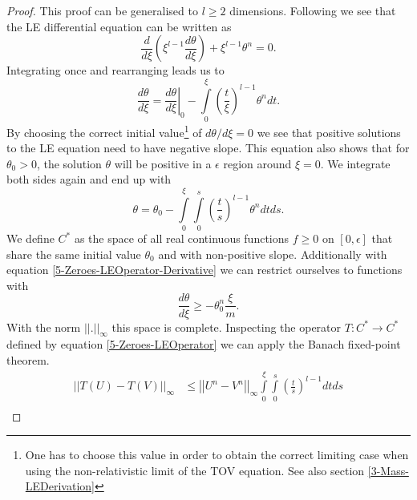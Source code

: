 \begin{proof}
	This proof can be generalised to $l\geq2$ dimensions. 
	Following \cite{quittnerSuperlinearParabolicProblems2007a} we see that the LE differential equation can be written as
	\begin{equation}
		\frac{d}{d\xi}\left(\xi^{l-1}\frac{d\theta}{d\xi}\right) + \xi^{l-1}\theta^n = 0.
	\end{equation}
	Integrating once and rearranging leads us to
	\begin{equation}
		\frac{d\theta}{d\xi} = \left.\frac{d\theta}{d\xi}\right|_0 - \int\limits_0^\xi\left(\frac{t}{\xi}\right)^{l-1}\theta^ndt.
		\label{5-Zeroes-LEOperator-Derivative}
	\end{equation}
	By choosing the correct initial value\footnote{One has to choose this value in order to obtain the correct limiting case when using the non-relativistic limit of the \ac{TOV} equation. See also section \ref{3-Mass-LEDerivation}} of $d\theta/d\xi=0$ we see that positive solutions to the LE equation need to have negative slope.
	This equation also shows that for $\theta_0>0$, the solution $\theta$ will be positive in a $\epsilon$ region around $\xi=0$.
	We integrate both sides again and end up with
	\begin{equation}
		\theta = \theta_0 - \int\limits_0^\xi\int\limits_0^s\left(\frac{t}{s}\right)^{l-1}\theta^ndtds.
		\label{5-Zeroes-LEOperator}
	\end{equation}
	We define $C^*$ as the space of all real continuous functions $f\geq0$ on $[0,\epsilon]$ that share the same initial value $\theta_0$ and with non-positive slope. %
	Additionally with equation \eqref{5-Zeroes-LEOperator-Derivative} we can restrict ourselves to functions with
	\begin{equation}
		\frac{d\theta}{d\xi} \geq -\theta_0^n\frac{\xi}{m}.
		\label{5-Zeroes-LEOperator-Restrict-Slope}
	\end{equation}
	With the norm $||.||_\infty$ this space is complete.
	Inspecting the operator $T:C^*\rightarrow C^*$ defined by
	equation \ref{5-Zeroes-LEOperator} we can apply the Banach fixed-point theorem.
	\begin{align}
		||T(U)-T(V)||_\infty	&\leq	\left|\left|U^n-V^n\right|\right|_\infty\int\limits_0^\xi\int\limits_0^s \left(\frac{t}{s}\right)^{l-1}dtds\\

\end{align}
\end{proof}
